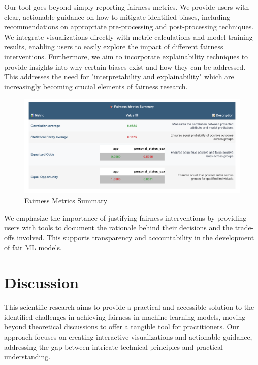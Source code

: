 \documentclass[runningheads]{llncs}
\begin{document}
Our tool goes beyond simply reporting fairness metrics. We provide users with clear, actionable guidance on how to mitigate identified biases, including recommendations on appropriate pre-processing and post-processing techniques.\\

We integrate visualizations directly with metric calculations and model training results, enabling users to easily explore the impact of different fairness interventions. Furthermore, we aim to incorporate explainability techniques to provide insights into why certain biases exist and how they can be addressed. This addresses the need for "interpretability and explainability" which are increasingly becoming crucial elements of fairness research.

\begin{figure}
\centering
\includegraphics[width=1\textwidth]{images/fairness-metrics-summary.png}
\caption{Fairness Metrics Summary} \label{fairness-metrics-summary}
\end{figure}

We emphasize the importance of justifying fairness interventions by providing users with tools to document the rationale behind their decisions and the trade-offs involved. This supports transparency and accountability in the development of fair ML models.

\section{Discussion}
This scientific research aims to provide a practical and accessible solution to the identified challenges\cite{caton2024fairness} in achieving fairness in machine learning models, moving beyond theoretical discussions to offer a tangible tool for practitioners. Our approach focuses on creating interactive visualizations and actionable guidance, addressing the gap between intricate technical principles and practical understanding.
\end{document}

